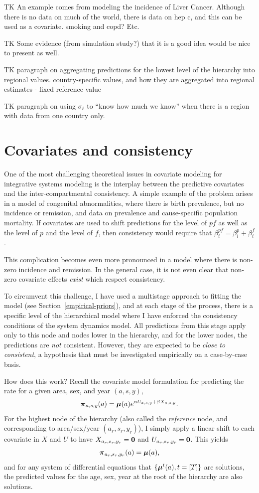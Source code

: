 TK An example comes from modeling the incidence of Liver Cancer.
Although there is no data on much of the world, there is data on hep
c, and this can be used as a covariate.  smoking and copd? Etc.

TK Some evidence (from simulation study?) that it is a good idea would
be nice to present as well.

TK paragraph on aggregating predictions for the lowest level of the
hierarchy into regional values.  country-specific values, and how they
are aggregated into regional estimates - fixed reference value

TK paragraph on using $\sigma_\ell$ to ``know how much we know''
when there is a region with data from one country only.

\section{Covariates and consistency}
One of the most challenging theoretical issues in covariate modeling
for integrative systems modeling is the interplay between the
predictive covariates and the inter-compartmental consistency.  A
simple example of the problem arises in a model of congenital
abnormalities, where there is birth prevalence, but no incidence or
remission, and data on prevalence and cause-specific population
mortality. If covariates are used to shift predictions for the level
of $pf$ as well as the level of $p$ and the level of $f$, then
consistency would require that $\beta^{pf}_i = \beta^p_i + \beta^f_i$.

This complication becomes even more pronounced in a model where there
is non-zero incidence and remission.  In the general case, it is not
even clear that non-zero covariate effects \emph{exist} which respect
consistency.

To circumvent this challenge, I have used a multistage approach to
fitting the model (see Section~\ref{empirical-priors}), and at each
stage of the process, there is a specific level of the hierarchical
model where I have enforced the consistency conditions of the system
dynamics model.  All predictions from this stage apply only to this
node and nodes lower in the hierarchy, and for the lower nodes, the
predictions are \emph{not} consistent.  However, they are expected to
be \emph{close to consistent}, a hypothesis that must be investigated
empirically on a case-by-case basis.

How does this work?  Recall the covariate model formulation for
predicting the rate for a given area, sex, and year $(a,s,y)$,
\[
{\boldsymbol{\pi}}_{a,s,y}(a) = \boldsymbol{\mu}(a)e^{\alpha U_{a,s,y} + \beta X_{a,s,y}}. 
\]
For the highest node of the hierarchy (also called the
\emph{reference} node, and corresponding to area/sex/year $(a_r, s_r,
y_r)$), I simply apply a linear shift to each covariate in $X$ and $U$
to have $X_{{a_r},{s_r},{y_r}} = \mathbf{0}$ and $U_{a_r,s_r,y_r} = \mathbf{0}$.  This
yields \[ {\boldsymbol{\pi}}_{a_r,s_r,y_r}(a) = \boldsymbol{\mu}(a), \] and for any system
of differential equations that $\{\boldsymbol{\mu}^t(a), t=[T]\}$ are
solutions, the predicted values for the age, sex, year at the root of
the hierarchy are also solutions.

